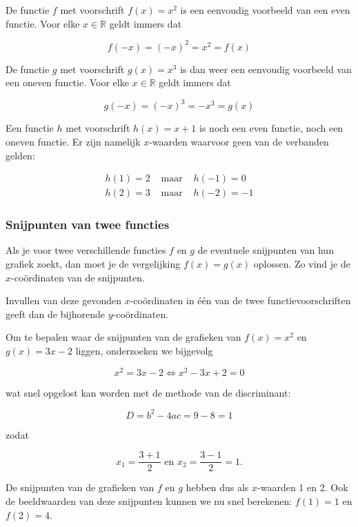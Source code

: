 \begin{voorbeeld}
	De functie $f$ met voorschrift $f(x)=x^2$ is een eenvoudig voorbeeld van een even functie. Voor elke  $x \in \mathbb{R}$ geldt immers dat 

\begin{equation*}
f(-x)=(-x)^2=x^2=f(x)
\end{equation*}

De functie $g$ met voorschrift $g(x)=x^3$ is dan weer een eenvoudig voorbeeld van een oneven functie. Voor elke $x \in \mathbb{R}$ geldt immers dat

\begin{equation*}
g(-x)=(-x)^3=-x^3=g(x)
\end{equation*}

Een functie $h$ met voorschrift $h(x)=x+1$ is noch een even functie, noch een oneven functie. Er zijn namelijk $x$-waarden waarvoor geen van de verbanden gelden:

\begin{eqnarray*}
h(1) = 2 &\text{ maar }& h(-1) = 0 \\
h(2) = 3 &\text{ maar }& h(-2) = -1 
\end{eqnarray*}

\end{voorbeeld}

\subsubsection{Snijpunten van twee functies}

Als je voor twee verschillende functies $f$ en $g$ de
eventuele snijpunten van hun grafiek zoekt, dan moet je de vergelijking
$f(x)=g(x)$ oplossen. Zo vind je de $x$-co\"ordinaten van de snijpunten.


Invullen van deze gevonden $x$-co\"ordinaten in één van de twee functievoorschriften
geeft dan de bijhorende $y$-co\"ordinaten.




\begin{voorbeeld}
	Om te bepalen waar de snijpunten van de grafieken van $f(x)=x^2$ en $g(x)=3x-2$ liggen, onderzoeken we bijgevolg

\begin{equation*}
x^2 = 3x-2 \iff x^2-3x+2=0
\end{equation*}

wat snel opgelost kan worden met de methode van de discriminant:

\begin{equation*}
D = b^2 - 4ac = 9-8=1
\end{equation*}

zodat

\begin{equation*}
x_1 = \frac{3+1}{2} \text{ en } x_2 = \frac{3-1}{2} = 1.
\end{equation*}


De snijpunten van de grafieken van $f$ en $g$ hebben dus als $x$-waarden 1 en 2. Ook de beeldwaarden van deze snijpunten kunnen we nu snel berekenen: $f(1)=1$ en $f(2)=4$.

\end{voorbeeld}

